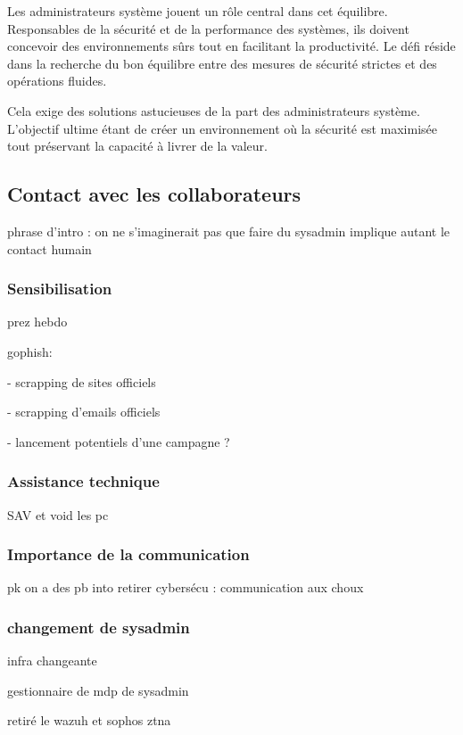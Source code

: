 Les administrateurs système jouent un rôle central dans cet équilibre.
Responsables de la sécurité et de la performance des systèmes, ils doivent concevoir des environnements sûrs tout en facilitant la productivité.
Le défi réside dans la recherche du bon équilibre entre des mesures de sécurité strictes et des opérations fluides.

Cela exige des solutions astucieuses de la part des administrateurs système.
L'objectif ultime étant de créer un environnement où la sécurité est maximisée tout préservant la capacité à livrer de la valeur.

\subsection{Contact avec les collaborateurs}
phrase d'intro : on ne s'imaginerait pas que faire du sysadmin implique autant le contact humain 
\subsubsection{Sensibilisation}
prez hebdo

gophish:

- scrapping de sites officiels

- scrapping d'emails officiels

- lancement potentiels d'une campagne ?

\subsubsection{Assistance technique}
SAV et void les pc

\subsubsection{Importance de la communication}
pk on a des pb into retirer cybersécu : communication aux choux

\subsubsection{changement de sysadmin}
infra changeante

gestionnaire de mdp de sysadmin

retiré le wazuh et sophos ztna
